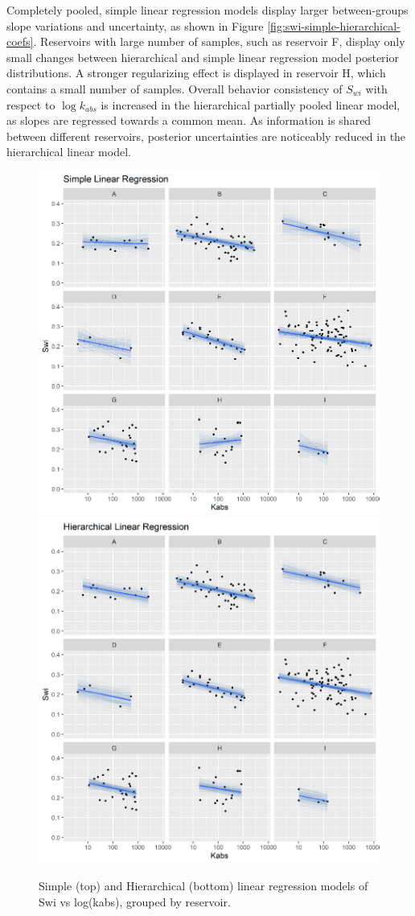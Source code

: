 \documentclass[english,msc,numbers]{coppe}
\begin{document}
  Completely pooled, simple linear regression models display larger between-groups slope variations and uncertainty, as shown in Figure \ref{fig:swi-simple-hierarchical-coefs}. Reservoirs with large number of samples, such as reservoir F, display only small changes between hierarchical and simple linear regression model posterior distributions. A stronger regularizing effect is displayed in reservoir H, which contains a small number of samples. Overall behavior consistency of \(S_{wi}\) with respect to \(\log{k_{abs}}\) is increased in the hierarchical partially pooled linear model, as slopes are regressed towards a common mean. As information is shared between different reservoirs, posterior uncertainties are noticeably reduced in the hierarchical linear model.
  \begin{figure}
  
  {\centering \includegraphics[width=0.75\linewidth]{figure/4-8-swi-simple} \includegraphics[width=0.75\linewidth]{figure/4-8-swi-hierarchical} 
  
  }
  
  \caption{Simple (top) and Hierarchical (bottom) linear regression models of Swi vs log(kabs), grouped by reservoir.}\label{fig:swi-simple-hierarchical}
  \end{figure}
\end{document}
